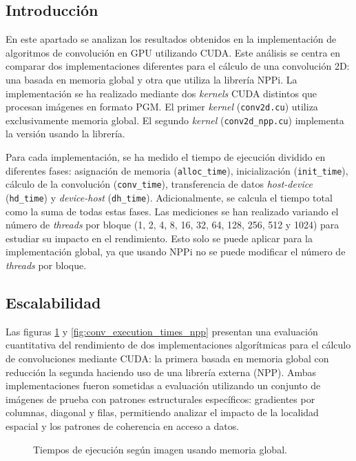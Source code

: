     \subsection{Introducción}

        En este apartado se analizan los resultados obtenidos en la implementación de algoritmos de convolución en GPU utilizando CUDA. Este análisis se centra en comparar dos implementaciones diferentes para el cálculo de una convolución 2D: una basada en memoria global y otra que utiliza la librería NPPi. 
        La implementación se ha realizado mediante dos \textit{kernels} CUDA distintos que procesan imágenes en formato PGM. El primer \textit{kernel} (\texttt{conv2d.cu}) utiliza exclusivamente memoria global. El segundo \textit{kernel} (\texttt{conv2d\_npp.cu}) implementa la versión usando la librería.

        Para cada implementación, se ha medido el tiempo de ejecución dividido en diferentes fases: asignación de memoria (\texttt{alloc\_time}), inicialización (\texttt{init\_time}), cálculo de la convolución (\texttt{conv\_time}), transferencia de datos \textit{host-device} (\texttt{hd\_time}) y \textit{ device-host} (\texttt{dh\_time}). Adicionalmente, se calcula el tiempo total como la suma de todas estas fases. Las mediciones se han realizado variando el número de \textit{threads} por bloque (1, 2, 4, 8, 16, 32, 64, 128, 256, 512 y 1024) para estudiar su impacto en el rendimiento. Esto solo se puede aplicar para la implementación global, ya que usando NPPi no se puede modificar el número de \textit{threads} por bloque.

        \newpage
    \subsection{Escalabilidad}
    
        Las figuras \ref{fig:conv_execution_times_global} y \ref{fig:conv_execution_times_npp} presentan una evaluación cuantitativa del rendimiento de dos implementaciones algorítmicas para el cálculo de convoluciones mediante CUDA: la primera basada en memoria global con reducción la segunda haciendo uso de una librería externa (NPP). Ambas implementaciones fueron sometidas a evaluación utilizando un conjunto de imágenes de prueba con patrones estructurales específicos: gradientes por columnas, diagonal y filas, permitiendo analizar el impacto de la localidad espacial y los patrones de coherencia en acceso a datos.
        
        \begin{figure}[H]
            \centering
            \caption{Tiempos de ejecución según imagen usando memoria global.}
            \label{fig:conv_execution_times_global}
        \end{figure}
        
